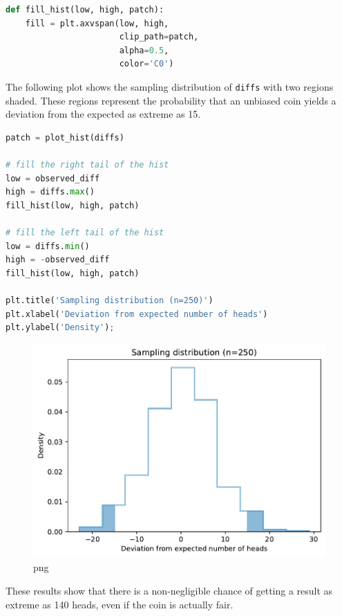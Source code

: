 \begin{lstlisting}[language=Python,style=source]
def fill_hist(low, high, patch):
    fill = plt.axvspan(low, high, 
                       clip_path=patch,
                       alpha=0.5, 
                       color='C0')
\end{lstlisting}

The following plot shows the sampling distribution of
\passthrough{\lstinline!diffs!} with two regions shaded. These regions
represent the probability that an unbiased coin yields a deviation from
the expected as extreme as 15.

\begin{lstlisting}[language=Python,style=source]
patch = plot_hist(diffs)

# fill the right tail of the hist
low = observed_diff
high = diffs.max()
fill_hist(low, high, patch)

# fill the left tail of the hist
low = diffs.min()
high = -observed_diff
fill_hist(low, high, patch)

plt.title('Sampling distribution (n=250)')
plt.xlabel('Deviation from expected number of heads')
plt.ylabel('Density');
\end{lstlisting}

\begin{figure}
\centering
\includegraphics{11_inference_files/11_inference_42_0.pdf}
\caption{png}
\end{figure}

These results show that there is a non-negligible chance of getting a
result as extreme as 140 heads, even if the coin is actually fair.


